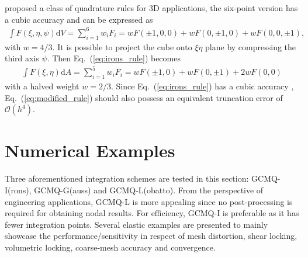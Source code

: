 \documentclass[3p,sort&compress,review,11pt]{elsarticle}
\newcommand*{\md}[1]{\mathrm{d}#1}
\newcommand*{\eqsref}[1]{Eq.~(\ref{#1})}
\begin{document}
\citet{Irons1971} proposed a class of quadrature rules for 3D applications, the six-point version has a cubic accuracy and can be expressed as
\begin{gather}\label{eq:irons_rule}
\int{}F\left(\xi,\eta,\psi\right)\md{V}=\sum_{i=1}^{6}w_iF_i=wF\left(\pm1,0,0\right)+wF\left(0,\pm1,0\right)+wF\left(0,0,\pm1\right),
\end{gather}
with $w=4/3$. It is possible to project the cube onto $\xi\eta$ plane by compressing the third axis $\psi$. Then \eqsref{eq:irons_rule} becomes
\begin{gather}\label{eq:modified_rule}
\int{}F\left(\xi,\eta\right)\md{A}=\sum_{i=1}^{5}w_iF_i=wF\left(\pm1,0\right)+wF\left(0,\pm1\right)+2wF\left(0,0\right)
\end{gather}
with a halved weight $w=2/3$. Since \eqsref{eq:irons_rule} has a cubic accuracy \citep{Irons1971}, \eqsref{eq:modified_rule} should also possess an equivalent truncation error of $\mathcal{O}(h^4)$.
\section{Numerical Examples}
Three aforementioned integration schemes are tested in this section: GCMQ-I(rons), GCMQ-G(auss) and GCMQ-L(obatto). From the perspective of engineering applications, GCMQ-L is more appealing since no post-processing is required for obtaining nodal results. For efficiency, GCMQ-I is preferable as it has fewer integration points. Several elastic examples are presented to mainly showcase the performance/sensitivity in respect of mesh distortion, shear locking, volumetric locking, coarse-mesh accuracy and convergence.
\end{document}
